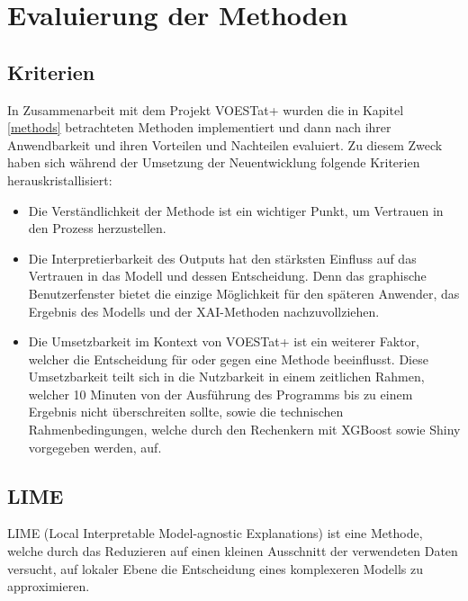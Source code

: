 \documentclass[12pt,titlepage,oneside]{book}
\begin{document}
\pagebreak
\chapter{Evaluierung der Methoden}

\section{Kriterien}
In Zusammenarbeit mit dem Projekt VOESTat+ wurden die in Kapitel \ref{methods} betrachteten Methoden implementiert und dann nach ihrer Anwendbarkeit und ihren Vorteilen und Nachteilen evaluiert. 
Zu diesem Zweck haben sich während der Umsetzung der Neuentwicklung folgende Kriterien herauskristallisiert:
\begin{itemize}
    \item Die Verständlichkeit der Methode ist ein wichtiger Punkt, um Vertrauen in den Prozess herzustellen.
    \item Die Interpretierbarkeit des Outputs hat den stärksten Einfluss auf das Vertrauen in das Modell und dessen Entscheidung. Denn das graphische Benutzerfenster bietet die einzige Möglichkeit für den späteren Anwender, das Ergebnis des Modells und der XAI-Methoden nachzuvollziehen. 
    \item Die Umsetzbarkeit im Kontext von VOESTat+ ist ein weiterer Faktor, welcher die Entscheidung für oder gegen eine Methode beeinflusst. Diese Umsetzbarkeit teilt sich in die Nutzbarkeit in einem zeitlichen Rahmen, welcher 10 Minuten von der Ausführung des Programms bis zu einem Ergebnis nicht überschreiten sollte, sowie die technischen Rahmenbedingungen, welche durch den Rechenkern mit XGBoost sowie Shiny vorgegeben werden, auf.
\end{itemize}

\newpage
\section{LIME} \label{lime-eval}
LIME (Local Interpretable Model-agnostic Explanations) ist eine Methode, welche durch das Reduzieren auf einen kleinen Ausschnitt der verwendeten Daten versucht, auf lokaler Ebene die Entscheidung eines komplexeren Modells zu approximieren.
\end{document}
